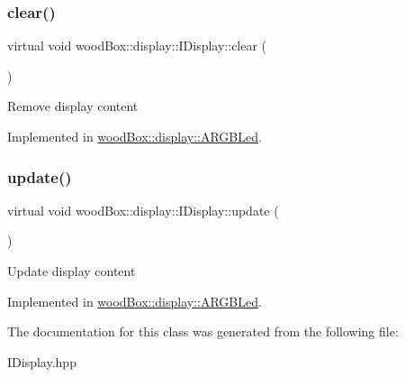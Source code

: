 \subsubsection{\texorpdfstring{clear()}{clear()}}
{\footnotesize\ttfamily virtual void wood\+Box\+::display\+::\+I\+Display\+::clear (\begin{DoxyParamCaption}{ }\end{DoxyParamCaption})\hspace{0.3cm}{\ttfamily [pure virtual]}}

Remove display content 

Implemented in \mbox{\hyperlink{classwood_box_1_1display_1_1_a_r_g_b_led_a01eeaee1bbb439e81f5f9bc536c04df7}{wood\+Box\+::display\+::\+A\+R\+G\+B\+Led}}.

\mbox{\label{classwood_box_1_1display_1_1_i_display_ad8c0811b8b807ce119a06c7806004de7}} 
\subsubsection{\texorpdfstring{update()}{update()}}
{\footnotesize\ttfamily virtual void wood\+Box\+::display\+::\+I\+Display\+::update (\begin{DoxyParamCaption}{ }\end{DoxyParamCaption})\hspace{0.3cm}{\ttfamily [pure virtual]}}

Update display content 

Implemented in \mbox{\hyperlink{classwood_box_1_1display_1_1_a_r_g_b_led_ab71f321d91e931f95b96d1f492a9454d}{wood\+Box\+::display\+::\+A\+R\+G\+B\+Led}}.



The documentation for this class was generated from the following file\+:\begin{DoxyCompactItemize}
\item 
I\+Display.\+hpp\end{DoxyCompactItemize}
